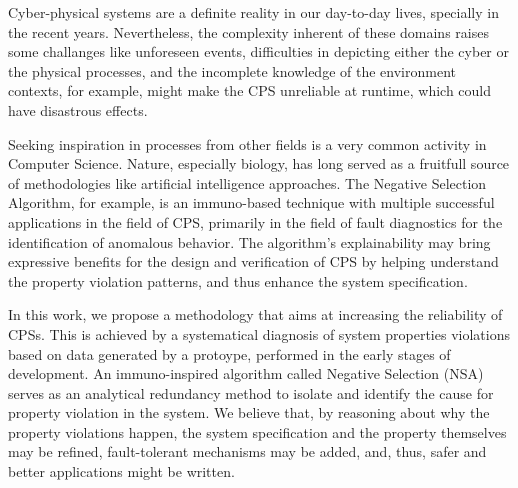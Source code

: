 Cyber-physical systems are a definite reality in our day-to-day lives, specially in the recent years. Nevertheless, the complexity inherent of these domains raises some challanges like unforeseen events, difficulties in depicting either the cyber or the physical processes, and the incomplete knowledge of the environment contexts, for example, might make the CPS unreliable at runtime, which could have disastrous effects. 

Seeking inspiration in processes from other fields is a very common activity in Computer Science. Nature, especially biology, has long served as a fruitfull source of methodologies like artificial intelligence approaches. The Negative Selection Algorithm, for example, is an immuno-based technique with multiple successful applications in the field of CPS, primarily in the field of fault diagnostics for the identification of anomalous behavior. The algorithm's explainability may bring expressive benefits for the design and verification of CPS by helping understand the property violation patterns, and thus enhance the system specification.

In this work, we propose a methodology that aims at increasing the reliability of CPSs. This is achieved by a systematical diagnosis of system properties violations based on data generated by a protoype, performed in the early stages of development. An immuno-inspired algorithm called Negative Selection (NSA) serves as an analytical redundancy method to isolate and identify the cause for property violation in the system. We believe that, by reasoning about why the property violations happen, the system specification and the property themselves may be refined, fault-tolerant mechanisms may be added, and, thus, safer and better applications might be written.